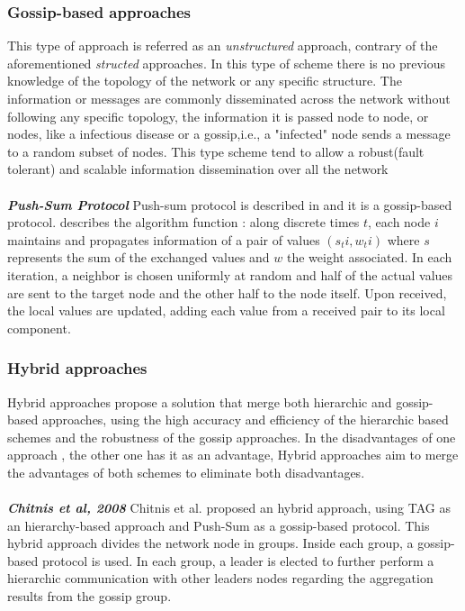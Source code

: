 \subsubsection{Gossip-based approaches}
This type of approach is referred as an \textit{unstructured} approach, contrary of the aforementioned \textit{structed} approaches. In this type of scheme there is no previous knowledge of the topology of the network or any specific structure. The information or messages are commonly disseminated across the network without following any specific topology, the information it is passed node to node, or nodes, like a infectious disease or a gossip,i.e., a "infected" node sends a message to a random subset of nodes. This type scheme tend to allow a robust(fault tolerant) and scalable information dissemination over all the network\cite{journals/corr/abs-1110-0725}\\
\\
\textbf{\textit{Push-Sum Protocol}}  Push-sum protocol is described in \cite{kempe2003gossip} and it is a gossip-based protocol. \cite{journals/corr/abs-1110-0725} describes the algorithm function : along discrete times $t$, each node $i$ maintains and propagates information of a pair of values $(s_ti,w_ti)$ where $s$ represents the sum of the exchanged values and $w$ the weight associated. In each iteration, a neighbor is chosen uniformly at random and half of the actual values are sent to the target node and the other half to the node itself. Upon received, the local values are updated, adding each value from a received pair to its local component.

\subsubsection{Hybrid approaches} 
Hybrid approaches propose a solution that merge both hierarchic and gossip-based approaches, using the high accuracy and efficiency of the hierarchic based schemes and the robustness of the gossip approaches. In the disadvantages of one approach , the other one has it as an advantage, Hybrid approaches aim to merge the advantages of both schemes to eliminate both disadvantages.\\
\\
\textbf{\textit{Chitnis et al, 2008}} Chitnis et al.\cite{chitnis2008aggregation} proposed an hybrid approach, using TAG as an hierarchy-based approach and Push-Sum as a gossip-based protocol. This hybrid approach divides the network node in groups. Inside each group, a gossip-based protocol is used. In each group, a leader is elected to further perform a hierarchic communication with other  leaders nodes regarding the aggregation results from the gossip group. 

